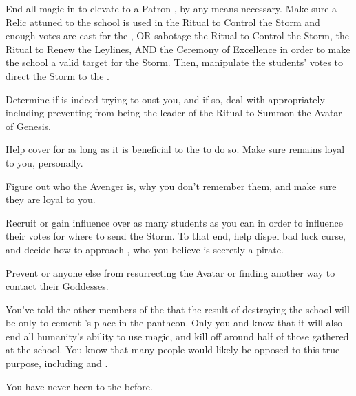 \documentclass[char]{GL2020}
\begin{document}
\begin{itemz}
	\item End all magic in \pEarth{} to elevate \cGenesis{} to a Patron \cGenesis{\God}, by any means necessary. Make sure a Relic attuned to the school is used in the Ritual to Control the Storm and enough votes are cast for the \pSc{}, OR sabotage the Ritual to Control the Storm, the Ritual to Renew the Leylines, AND the Ceremony of Excellence in order to make the school a valid target for the Storm. Then, manipulate the students' votes to direct the Storm to the \pSc{}.
	\item Determine if \cChupSecond{} is indeed trying to oust you, and if so, deal with \cChupSecond{\them} appropriately -- including preventing \cChupSecond{\them} from being the leader of the Ritual to Summon the Avatar of Genesis.
	\item Help \cChupInventor{} cover for \cHeadScientist{} as long as it is beneficial to the \pGoaties{} to do so. Make sure \cChupInventor{} remains loyal to you, personally.
	\item Figure out who the Avenger is, why you don't remember them, and make sure they are loyal to you.
	\item Recruit or gain influence over as many students as you can in order to influence their votes for where to send the Storm. To that end, help \cInitiate{} dispel \cInitiate{\their} bad luck curse, and decide how to approach \cPirateChild{}, who you believe is secretly a pirate.
	\item Prevent \cEbbPriest{} or anyone else from resurrecting the \cEbb{} Avatar or finding another way to contact their Goddesses.
\end{itemz}

\begin{itemz}[Notes]
	\item You've told the other members of the \pGoaties{} that the result of destroying the school will be only to cement \cGenesis{}'s place in the pantheon. Only you and \cChupSecond{} know that it will also end all humanity's ability to use magic, and kill off around half of those gathered at the school. You know that many people would likely be opposed to this true purpose, including \cChupInventor{} and \cChupStudent{}.
	\item You have never been to the \pSchool{} before.
\end{itemz}
\end{document}
